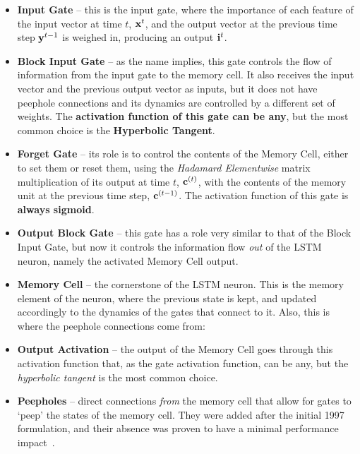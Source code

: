 \begin{itemize}
    \item \textbf{Input Gate} -- this is the input gate, where the importance of each feature of the input vector at time $t$, $\mathbf{x}^t$, and the output vector at the previous time step $\mathbf{y}^{t-1}$ is weighed in, producing an output $\mathbf{i}^{t}$.

    \item \textbf{Block Input Gate} -- as the name implies, this gate controls the flow of information from the input gate to the memory cell. It also receives the input vector and the previous output vector as inputs, but it does not have peephole connections and its dynamics are controlled by a different set of weights. The \textbf{activation function of this gate can be any}, but the most common choice is the \textbf{Hyperbolic Tangent}.

    \item \textbf{Forget Gate} -- its role is to control the contents of the Memory Cell, either to set them or reset them, using the \textit{Hadamard Elementwise} matrix multiplication of its output at time $t$, $\mathbf{c}^{(t)}$, with the contents of the memory unit at the previous time step, $\mathbf{c}^{(t-1)}$. The activation function of this gate is \textbf{always sigmoid}.

    \item \textbf{Output Block Gate} -- this gate has a role very similar to that of the Block Input Gate, but now it controls the information flow \textit{out} of the LSTM neuron, namely the activated Memory Cell output.

    \item \textbf{Memory Cell} -- the cornerstone of the LSTM neuron. This is the memory element of the neuron, where the previous state is kept, and updated accordingly to the dynamics of the gates that connect to it. Also, this is where the peephole connections come from:  

    \item \textbf{Output Activation} -- the output of the Memory Cell goes through this activation function that, as the gate activation function, can be any, but the \textit{hyperbolic tangent} is the most common choice.

    \item \textbf{Peepholes} -- direct connections \textit{from} the memory cell that allow for gates to `peep' the states of the memory cell. They were added after the initial 1997 formulation, and their absence was proven to have a minimal performance impact~\cite{Greff15}.
\end{itemize}

